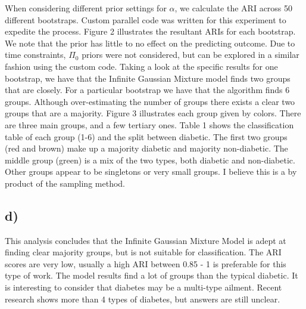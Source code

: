 \documentclass[12pt, centerh1]{article}
\begin{document}
When considering different prior settings for $\alpha$, we calculate the ARI across 50 different bootstraps. Custom parallel code was written for this experiment to expedite the process. Figure 2 illustrates the resultant ARIs for each bootstrap. We note that the prior has little to no effect on the predicting outcome. Due to time constraints, $\Pi_0$ priors were not considered, but can be explored in a similar fashion using the custom code. Taking a look at the specific results for one bootstrap, we have that the Infinite Gaussian Mixture model finds two groups that are closely. For a particular bootstrap we have that the algorithm finds $6$ groups. Although over-estimating the number of groups there exists a clear two groups that are a majority. Figure 3 illustrates each group given by colors. There are three main groups, and a few tertiary ones. Table 1 shows the classification table of each group (1-6) and the split between diabetic.  The first two groups (red and brown) make up a majority diabetic and majority non-diabetic. The middle group (green) is a mix of the two types, both diabetic and non-diabetic. Other groups appear to be singletons or very small groups. I believe this is a by product of the sampling method. 


\subsection*{d)}
This analysis concludes that the Infinite Gaussian Mixture Model is adept at finding clear majority groups, but is not suitable for classification. The ARI scores are very low, usually a high ARI between 0.85 - 1 is preferable for this type of work. The model results find a lot of groups than the typical diabetic. It is interesting to consider that diabetes may be a multi-type ailment. Recent research shows more than 4 types of diabetes, but answers are still unclear. 
\end{document}
